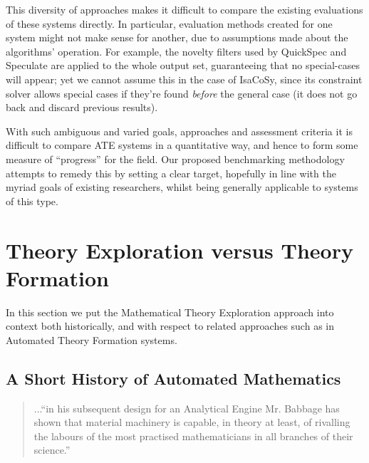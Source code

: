 This diversity of approaches makes it difficult to compare the existing
evaluations of these systems directly. In particular, evaluation methods created
for one system might not make sense for another, due to assumptions made about
the algorithms' operation. For example, the novelty filters used by QuickSpec
and Speculate are applied to the whole output set, guaranteeing that no
special-cases will appear; yet we cannot assume this in the case of IsaCoSy,
since its constraint solver allows special cases if they're found \emph{before}
the general case (it does not go back and discard previous results).

With such ambiguous and varied goals, approaches and assessment criteria it is
difficult to compare ATE systems in a quantitative way, and hence to form some
measure of ``progress'' for the field. Our proposed benchmarking methodology
attempts to remedy this by setting a clear target, hopefully in line with the
myriad goals of existing researchers, whilst being generally applicable to
systems of this type.

\section{Theory Exploration versus Theory
  Formation}\label{exploration-versus-formation}

In this section we put the Mathematical Theory Exploration approach
into context both historically, and with respect to related approaches
such as in Automated Theory Formation systems.

\subsection{A Short History of Automated Mathematics}

\begin{quote}
...``in his subsequent design for an Analytical Engine Mr. Babbage has
shown that material machinery is capable, in theory at least, of
rivalling the labours of the most practised mathematicians in all
branches of their science.'' \cite[p. 498]{jevons}
\end{quote}

